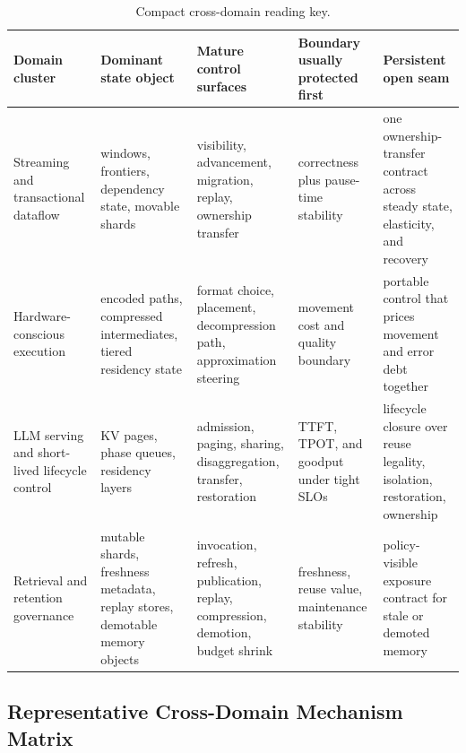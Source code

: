 \begin{table}[t]
\small
\setlength{\tabcolsep}{3.5pt}
\caption{Compact cross-domain reading key.}
\label{tab:supp-comparison-guide}
\begin{tabularx}{\textwidth}{>{\raggedright\arraybackslash}p{}>{\raggedright\arraybackslash}p{}>{\raggedright\arraybackslash}p{}>{\raggedright\arraybackslash}p{}>{\raggedright\arraybackslash}Y}
\toprule
Domain cluster & Dominant state object & Mature control surfaces & Boundary usually protected first & Persistent open seam \\
\midrule
Streaming and transactional dataflow & windows, frontiers, dependency state, movable shards & visibility, advancement, migration, replay, ownership transfer & correctness plus pause-time stability & one ownership-transfer contract across steady state, elasticity, and recovery \\

Hardware-conscious execution & encoded paths, compressed intermediates, tiered residency state & format choice, placement, decompression path, approximation steering & movement cost and quality boundary & portable control that prices movement and error debt together \\

LLM serving and short-lived lifecycle control & KV pages, phase queues, residency layers & admission, paging, sharing, disaggregation, transfer, restoration & TTFT, TPOT, and goodput under tight SLOs & lifecycle closure over reuse legality, isolation, restoration, ownership \\

Retrieval and retention governance & mutable shards, freshness metadata, replay stores, demotable memory objects & invocation, refresh, publication, replay, compression, demotion, budget shrink & freshness, reuse value, maintenance stability & policy-visible exposure contract for stale or demoted memory \\
\bottomrule
\end{tabularx}
\end{table}

\subsection{Representative Cross-Domain Mechanism Matrix}

